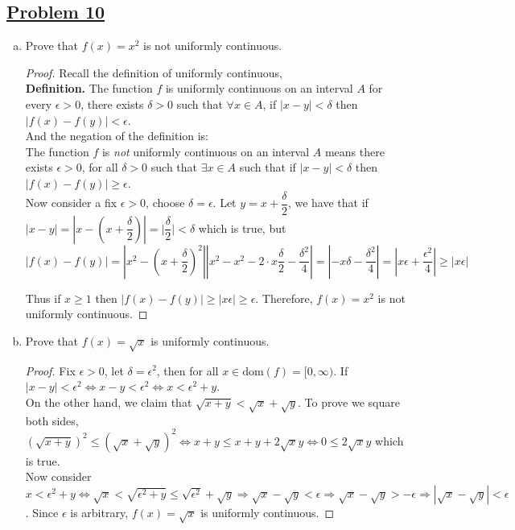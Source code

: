 \documentclass[10pt,letterpaper]{article}
\begin{document}
	\subsection*{{\color{purple}\underline{Problem 10}}}
	\begin{enumerate}[(a)]
	\item Prove that $f(x) = x^2$ is not uniformly continuous. 
	\begin{proof}
		Recall the definition of uniformly continuous, \\
		\textbf{Definition. } The function $f$ is uniformly continuous on an 
		interval $A$ for every $\epsilon > 0$, there exists $\delta > 0$ such that
		$\forall x \in A$, if $|x - y| < \delta$ then $|f(x) - f(y)| < \epsilon$. \\
		And the negation of the definition is: \\
		The function $f$ is \emph{not} uniformly continuous on an interval $A$ means
		there exists $\epsilon > 0$, for all $\delta > 0$ such that $\exists x \in A$
		such that if $|x - y| < \delta$ then $|f(x) - f(y)| \geq \epsilon$. \\
		Now consider a fix $\epsilon > 0$, choose $\delta = \epsilon$. Let $y = x + \dfrac{\delta}{2}$, we have
		that if $|x - y| = |x - (x + \dfrac{\delta}{2})| = \bigg|\dfrac{\delta}{2}\bigg| < \delta$ 
		which is true, but 
		$$|f(x) - f(y)| = |x^2 - (x + \dfrac{\delta}{2})^2|
		|x^2 - x^2 - 2 \cdot x \dfrac{\delta}{2} - \dfrac{\delta^2}{4}| = 
		|-x\delta - \dfrac{\delta^2}{4}| = |x \epsilon + \dfrac{\epsilon^2}{4}| \geq |x \epsilon|$$
		
		Thus if $x \geq 1$ then $|f(x) - f(y)| \geq |x\epsilon| \geq \epsilon$. Therefore,
		$f(x) = x^2$ is not uniformly continuous.	
	\end{proof}
	
	\item Prove that $f(x) = \sqrt{x}$ is uniformly continuous. 
	\begin{proof}
		Fix $\epsilon > 0$, let $\delta = \epsilon^2$, then for all $x \in \mathrm{dom}(f) = [0, \infty)$.
		If $|x - y| < \epsilon^2 \Leftrightarrow x - y < \epsilon^2 \Leftrightarrow 
		x < \epsilon^2 + y$. \\
		On the other hand, we claim that $\sqrt{x + y} < \sqrt{x} + \sqrt{y}$. To prove
		we square both sides, $(\sqrt{x + y})^2 \leq (\sqrt{x} + \sqrt{y})^2 \Leftrightarrow
		x + y \leq x + y + 2\sqrt{x}{y} \Leftrightarrow 0 \leq 2\sqrt{x}{y}$ which is true. \\
		Now consider 
		$x < \epsilon^2 + y \Leftrightarrow \sqrt{x} < \sqrt{\epsilon^2 + y} \leq
		\sqrt{\epsilon^2} + \sqrt{y} \Rightarrow \sqrt{x} - \sqrt{y} < \epsilon \Rightarrow
		\sqrt{x} - \sqrt{y} > -\epsilon \Rightarrow |\sqrt{x} - \sqrt{y}| < \epsilon$.
		Since $\epsilon$ is arbitrary, $f(x) = \sqrt{x}$ is uniformly continuous. 
	\end{proof}		
	\end{enumerate}
	
\end{document}

